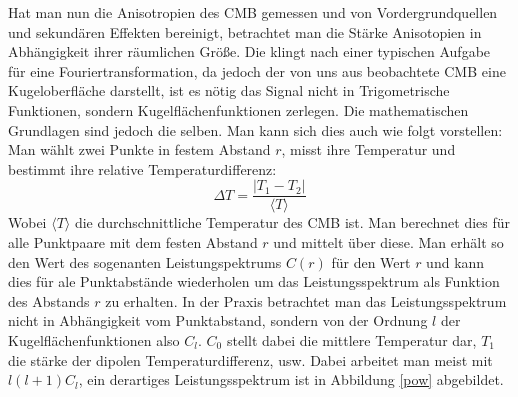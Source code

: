 \documentclass[10pt,a4paper]{article}
\begin{document}
Hat man nun die Anisotropien des CMB gemessen und von Vordergrundquellen und sekundären Effekten bereinigt, betrachtet man die Stärke Anisotopien in Abhängigkeit ihrer räumlichen Größe.
Die klingt nach einer typischen Aufgabe für eine Fouriertransformation, da jedoch der von uns aus beobachtete CMB eine Kugeloberfläche darstellt, ist es nötig das Signal nicht in Trigometrische Funktionen, sondern Kugelflächenfunktionen zerlegen. Die mathematischen Grundlagen sind jedoch die selben. 
Man kann sich dies auch wie folgt vorstellen:
Man wählt zwei Punkte in festem Abstand $r$, misst ihre Temperatur und bestimmt ihre relative Temperaturdifferenz:
\begin{equation}
\Delta T = \frac{|T_1-T_2|}{\langle T\rangle }
\end{equation}
Wobei $\langle T\rangle$ die durchschnittliche Temperatur des CMB ist. Man berechnet dies für alle Punktpaare mit dem festen Abstand $r$ und mittelt über diese. Man erhält so den Wert des sogenanten Leistungspektrums $C(r)$ für den Wert $r$ und kann dies für ale Punktabstände wiederholen um das Leistungsspektrum als Funktion des Abstands $r$ zu erhalten. In der Praxis betrachtet man das Leistungsspektrum nicht in Abhängigkeit vom Punktabstand, sondern von der Ordnung $l$ der Kugelflächenfunktionen also $C_l$. $C_0$ stellt dabei die mittlere Temperatur dar, $T_1$ die stärke der dipolen Temperaturdifferenz, usw.
Dabei arbeitet man meist mit $l\left(l+1\right)C_l$, ein derartiges Leistungsspektrum ist in Abbildung \ref{pow} abgebildet.
\end{document}
